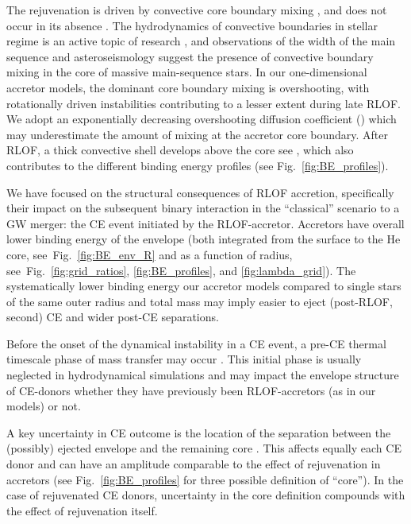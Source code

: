 \documentclass[twocolumn,twocolappendix,trackchanges]{aastex63}
\DeclareRobustCommand{\Figref}[1]{Fig.~\ref{#1}}
\begin{document}
The rejuvenation is driven by convective core boundary mixing
\citep[e.g.,][]{hellings:1983, hellings:1984, cantiello:2007, renzo:2021zoph}, and
does not occur in its absence \citep{braun:95}. The hydrodynamics of
convective boundaries in stellar regime is an active topic of research
\citep[e.g.,][]{anders:22a, anders:22b}, and observations of the width
of the main sequence \citep[e.g.,][]{brott:11} and asteroseismology
\citep[e.g.,][]{moravveji:16} suggest the presence of convective
boundary mixing in the core of massive main-sequence stars. In our
one-dimensional accretor models, %
the dominant core boundary mixing is overshooting,
with rotationally driven instabilities contributing to a lesser extent
during late RLOF. We adopt an exponentially decreasing overshooting
diffusion coefficient (\citealt{claret:17}) which may underestimate
the amount of mixing at the accretor core boundary. After RLOF, a
thick convective shell develops above the core see
\citep[see][]{renzo:2021zoph}, which also contributes to the different
binding energy profiles (see \Figref{fig:BE_profiles}).

We have focused on the structural consequences of RLOF accretion,
specifically their impact on the subsequent binary interaction in the
``classical'' scenario to a GW merger: the CE event initiated by the
RLOF-accretor. Accretors have overall lower binding energy of the envelope
(both integrated from the surface to the He core,
see~\Figref{fig:BE_env_R} and as a function of radius,
see~\Figref{fig:grid_ratios}, \ref{fig:BE_profiles}, and \ref{fig:lambda_grid}). The
systematically lower binding energy our accretor models compared to
single stars of the same outer radius and total mass may %
imply easier to eject (post-RLOF, second) CE and wider post-CE separations. %

Before the onset of the dynamical instability in a CE
event, a pre-CE thermal timescale phase of mass transfer may occur
\citep[e.g.,][]{hjellming:1987, pejcha:17, blagorodnova:2021}. This
initial phase is usually neglected in hydrodynamical simulations and
may impact the envelope structure of CE-donors whether they have
previously been RLOF-accretors (as in our models) or not.

A key uncertainty in CE outcome is the location of the separation
between the (possibly) ejected envelope and the remaining core
\citep[e.g.,][]{tauris:01}. This affects equally each CE donor and
can have an amplitude comparable to the effect of rejuvenation in
accretors (see \Figref{fig:BE_profiles} for three possible definition
of ``core''). In the case of rejuvenated CE donors, uncertainty in the
core definition compounds with the effect of rejuvenation itself.
\end{document}
